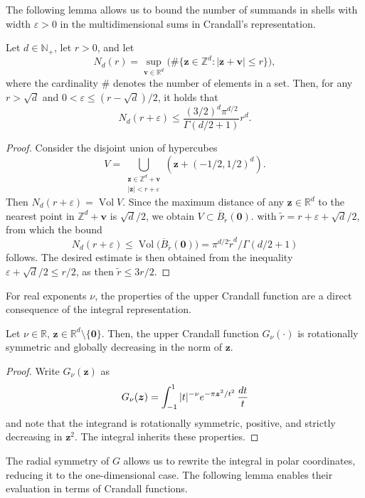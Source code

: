 \documentclass[]{amsart}
\DeclareMathOperator{\Vol}{Vol}
\numberwithin{mythm}{section}
\begin{document}
The following lemma allows us to bound the number of summands in shells with width $\varepsilon>0$ in the multidimensional sums in Crandall's representation. 


\begin{lemma}
\label{lem:shells}
Let $d\in\mathds N_+$, let $r>0$, and let
$$
N_{d}(r)=\sup_{\bm v\in \mathds R^d}\big(\# 
\{\bm z\in\mathds Z^d: |\bm z+\bm v|\le r\}\big),
$$
where the cardinality $\#$ denotes the number of elements in a set. 
Then, for any $r>\sqrt{d}$ and $0<\varepsilon\le (r-\sqrt{d})/2$, it holds that
$$
N_d(r+\varepsilon) 
\le 
\frac{(3/2)^d\pi^{d/2}}{\Gamma(d/2+1)}r^d.
$$
\end{lemma}

\begin{proof}
Consider the disjoint union of hypercubes
$$
V=
\bigcup_{
\substack{\bm z\in\mathds Z^d+\bm v\\ |\bm z|<r+\varepsilon}}
\!\!
(\bm z+(-1/2,1/2)^d).
$$
Then $N_d(r+\varepsilon)=\Vol V$.
Since the maximum distance of any $\bm z\in\mathds R^d$ to the nearest point in $\mathds Z^d+\bm v$ is $\sqrt{d}/2$, we obtain
$
V\subset 
\overline{B}_{\tilde r}(\bm 0).
$
with $\tilde r = r+\varepsilon+\sqrt{d}/2$, from which the bound
$$
N_d(r+\varepsilon)\le \Vol  \big(\overline{B}_{\tilde r}(\bm 0)\big)= 
\pi^{d/2}{\tilde r}^d/\Gamma(d/2+1)
$$
follows.
The desired estimate is then obtained from the inequality $\varepsilon+\sqrt{d}/2\le r/2$, as then $\tilde r\le 3r/2$.
\end{proof}

For real exponents $\nu$, the properties of the upper Crandall function are a direct consequence of the integral representation.

\begin{lemma}
\label{lemma:g-mon}
Let $\nu \in \mathds{R}$, $\bm z \in \mathds{R}^d\setminus\{\bm 0\}$. Then, the upper Crandall function \(G_{\nu}(\cdot)\) is rotationally symmetric and globally decreasing in the norm of $\bm z$.
\end{lemma}

\begin{proof}
Write $G_\nu(\bm z)$ as 
\[G_{\nu}(\bm z)=\int_{-1}^1|t|^{-\nu}e^{-\pi \bm z^2/t^2}\,\frac{\rm dt}{t}\]
and note that the integrand is rotationally symmetric, positive, and strictly decreasing in \(\bm z^2\). The integral  inherits these properties.
\end{proof}

The radial symmetry of $G$ allows us to rewrite the integral in polar coordinates, reducing it to the one-dimensional case.  The following lemma enables their evaluation in terms of Crandall functions.
\end{document}

